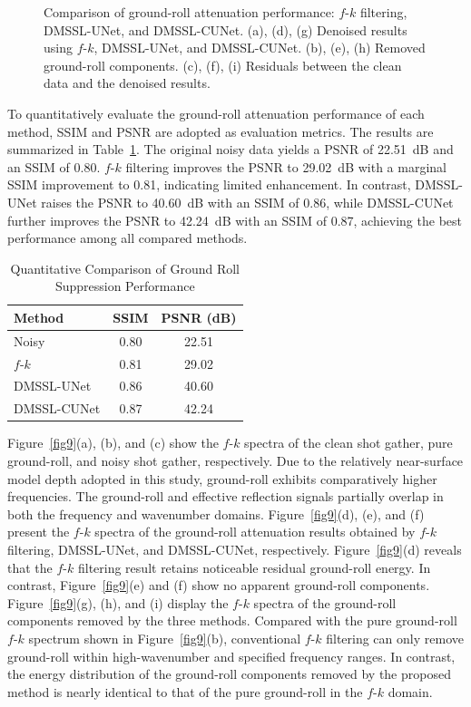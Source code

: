 \documentclass[alpha-refs]{wiley-article}
\begin{document}
\begin{figure}[bt]
    \caption{Comparison of ground-roll attenuation performance: $f$-$k$ filtering, DMSSL-UNet, 
    and DMSSL-CUNet. (a), (d), (g) Denoised results using $f$-$k$, DMSSL-UNet, and 
    DMSSL-CUNet. (b), (e), (h) Removed ground-roll components. (c), (f), (i) Residuals 
    between the clean data and the denoised results.}
    \label{fig8}
\end{figure}

To quantitatively evaluate the ground-roll attenuation performance of each method, SSIM 
and PSNR are adopted as evaluation metrics. The results are summarized in 
Table~\ref{tab:synthetic}. The original noisy data yields a PSNR of 22.51~dB and an SSIM 
of 0.80. $f$-$k$ filtering improves the PSNR to 29.02~dB with a marginal SSIM improvement to 
0.81, indicating limited enhancement. In contrast, DMSSL-UNet raises the PSNR to 
40.60~dB with an SSIM of 0.86, while DMSSL-CUNet further improves the PSNR to 42.24~dB 
with an SSIM of 0.87, achieving the best performance among all compared methods.

\begin{table}[bt]
\caption{Quantitative Comparison of Ground Roll Suppression Performance}
\label{tab:synthetic}
\begin{tabularx}{\linewidth}{Xcc}
\hline
Method & SSIM & PSNR (dB) \\
\hline
Noisy        & 0.80 & 22.51 \\
$f$-$k$          & 0.81 & 29.02 \\
DMSSL-UNet   & 0.86 & 40.60 \\
DMSSL-CUNet  & 0.87 & 42.24 \\
\hline
\end{tabularx}
\end{table}

Figure~\ref{fig9}(a), (b), and (c) show the $f$-$k$ spectra of the clean shot gather, pure 
ground-roll, and noisy shot gather, respectively. Due to the relatively near-surface model 
depth adopted in this study, ground-roll exhibits comparatively higher frequencies. The 
ground-roll and effective reflection signals partially overlap in both the frequency and 
wavenumber domains. Figure~\ref{fig9}(d), (e), and (f) present the $f$-$k$ spectra of the 
ground-roll attenuation results obtained by $f$-$k$ filtering, DMSSL-UNet, and DMSSL-CUNet, 
respectively. Figure~\ref{fig9}(d) reveals that the $f$-$k$ filtering result retains noticeable 
residual ground-roll energy. In contrast, Figure~\ref{fig9}(e) and (f) show no apparent 
ground-roll components. Figure~\ref{fig9}(g), (h), and (i) display the $f$-$k$ spectra of the 
ground-roll components removed by the three methods. Compared with the pure ground-roll 
$f$-$k$ spectrum shown in Figure~\ref{fig9}(b), conventional $f$-$k$ filtering can only remove 
ground-roll within high-wavenumber and specified frequency ranges. In contrast, the energy 
distribution of the ground-roll components removed by the proposed method is nearly 
identical to that of the pure ground-roll in the $f$-$k$ domain.
\end{document}
